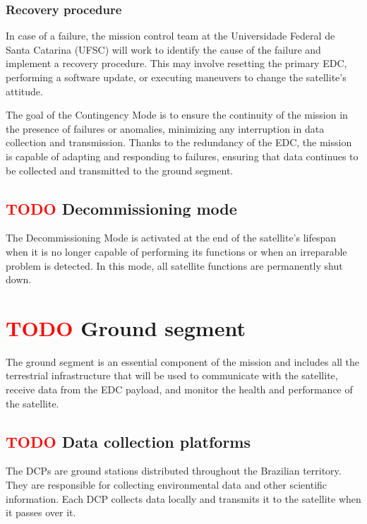 \subsubsection{Recovery procedure}

In case of a failure, the mission control team at the Universidade Federal de Santa Catarina (UFSC) will work to identify the cause of the failure and implement a recovery procedure. This may involve resetting the primary EDC, performing a software update, or executing maneuvers to change the satellite's attitude.

The goal of the Contingency Mode is to ensure the continuity of the mission in the presence of failures or anomalies, minimizing any interruption in data collection and transmission. Thanks to the redundancy of the EDC, the mission is capable of adapting and responding to failures, ensuring that data continues to be collected and transmitted to the ground segment.

\subsection{ \textcolor{red}{TODO} Decommissioning mode}

The Decommissioning Mode is activated at the end of the satellite's lifespan when it is no longer capable of performing its functions or when an irreparable problem is detected. In this mode, all satellite functions are permanently shut down.

\section{ \textcolor{red}{TODO} Ground segment}

The ground segment is an essential component of the mission and includes all the terrestrial infrastructure that will be used to communicate with the satellite, receive data from the EDC payload, and monitor the health and performance of the satellite.

\subsection{ \textcolor{red}{TODO} Data collection platforms}

The DCPs are ground stations distributed throughout the Brazilian territory. They are responsible for collecting environmental data and other scientific information. Each DCP collects data locally and transmits it to the satellite when it passes over it.

